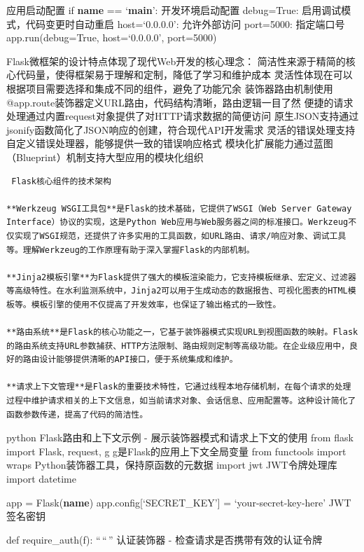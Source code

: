  应用启动配置 if \textbf{name} == `\textbf{main}':  开发环境启动配置  debug=True: 启用调试模式，代码变更时自动重启  host=`0.0.0.0': 允许外部访问  port=5000: 指定端口号 app.run(debug=True, host=`0.0.0.0', port=5000)

 Flask微框架的设计特点体现了现代Web开发的核心理念：  简洁性来源于精简的核心代码量，使得框架易于理解和定制，降低了学习和维护成本  灵活性体现在可以根据项目需要选择和集成不同的组件，避免了功能冗余  装饰器路由机制使用@app.route装饰器定义URL路由，代码结构清晰，路由逻辑一目了然  便捷的请求处理通过内置request对象提供了对HTTP请求数据的简便访问  原生JSON支持通过jsonify函数简化了JSON响应的创建，符合现代API开发需求  灵活的错误处理支持自定义错误处理器，能够提供一致的错误响应格式  模块化扩展能力通过蓝图（Blueprint）机制支持大型应用的模块化组织

\begin{lstlisting}
 Flask核心组件的技术架构

**Werkzeug WSGI工具包**是Flask的技术基础，它提供了WSGI（Web Server Gateway Interface）协议的实现，这是Python Web应用与Web服务器之间的标准接口。Werkzeug不仅实现了WSGI规范，还提供了许多实用的工具函数，如URL路由、请求/响应对象、调试工具等。理解Werkzeug的工作原理有助于深入掌握Flask的内部机制。

**Jinja2模板引擎**为Flask提供了强大的模板渲染能力，它支持模板继承、宏定义、过滤器等高级特性。在水利监测系统中，Jinja2可以用于生成动态的数据报告、可视化图表的HTML模板等。模板引擎的使用不仅提高了开发效率，也保证了输出格式的一致性。

**路由系统**是Flask的核心功能之一，它基于装饰器模式实现URL到视图函数的映射。Flask的路由系统支持URL参数捕获、HTTP方法限制、路由规则定制等高级功能。在企业级应用中，良好的路由设计能够提供清晰的API接口，便于系统集成和维护。

**请求上下文管理**是Flask的重要技术特性，它通过线程本地存储机制，在每个请求的处理过程中维护请求相关的上下文信息，如当前请求对象、会话信息、应用配置等。这种设计简化了函数参数传递，提高了代码的简洁性。
\end{lstlisting}

python  Flask路由和上下文示例 - 展示装饰器模式和请求上下文的使用 from flask import Flask, request, g  g是Flask的应用上下文全局变量 from functools import wraps  Python装饰器工具，保持原函数的元数据 import jwt  JWT令牌处理库 import datetime

app = Flask(\textbf{name}) app.config{[}`SECRET\_KEY'{]} = `your-secret-key-here'  JWT签名密钥

def require\_auth(f): ``\,``\,'' 认证装饰器 - 检查请求是否携带有效的认证令牌


